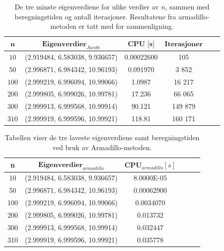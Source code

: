 \documentclass{article}
\begin{document}
\FloatBarrier
\begin{table}[!ht]
\centering
\caption{De tre minste eigenverdiene for ulike verdier av $n$, sammen med beregningstiden og antall iterasjoner. Resultatene fra armadillo-metoden er tatt med for sammenligning.}
\label{tab:jacobi}
\begin{tabular}{|c|c|c|c|c|c|}
\hline
$\textbf{n}$      &  $\textbf{Eigenverdier}_{Jacobi}$ & $\textbf{CPU [s]}$ & $\textbf{Iterasjoner}$ \\ 
\hline
$10$     & (2.919484, 6.583038, 9.936657) &  0.00022600 & 105               \\ 
\hline
$50$ & (2.996871, 6.984342, 10.96193)     & 0.091970     & 3 852             \\ 
\hline
$100$ & (2.999219, 6.996094, 10.99066)     & 1.0987      & 16 217         \\ 
\hline
$200$ & (2.999805, 6.999026, 10.99781)     & 17.236     & 66 065             \\ 
\hline
$300$ & (2.999913, 6.999568, 10.99914)     & 90.121    & 149 879               \\ 
\hline
$310$ & (2.999919, 6.999596, 10.99921)     &  118.81   & 160 171     \\ 
\hline       
\end{tabular}
\end{table}
\FloatBarrier

\FloatBarrier
\begin{table}[!ht]
\centering
\caption{Tabellen viser de tre laveste eigenverdiene samt beregningstiden ved bruk av Armadillo-metoden.}
\label{tab:armadillo}
\begin{tabular}{|c|c|c|c|c|c|}
\hline
\textbf{n}     &  $\textbf{Eigenverdier}_{armadillo}$  &  $\textbf{CPU}_{armadillo} [s]$  \\ 
\hline
10     & (2.919484,   6.583038,   9.936657)  &8.0000E-05     \\ 
\hline
50 & (2.996871, 6.984342, 10.96193)  &     0.00062900        \\ 
\hline
100 & (2.999219, 6.996094, 10.99066)  & 0.0034070         \\ 
\hline
200 & (2.999805, 6.999026, 10.99781)  & 0.013732     \\ 
\hline   
300 & (2.999913, 6.999568, 10.99914) & 0.032447      \\ 
\hline   
310 & (2.999919, 6.999596, 10.99921)  & 0.035778     \\ 
\hline   
\end{tabular}
\end{table}
\FloatBarrier
\end{document}
